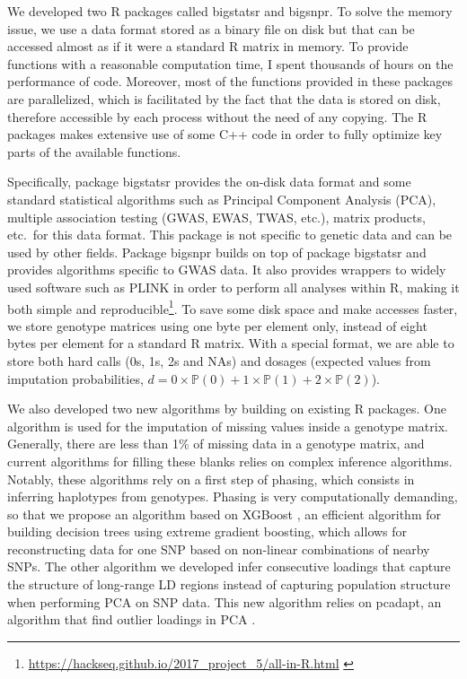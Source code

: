 We developed two R packages called bigstatsr and bigsnpr. 
To solve the memory issue, we use a data format stored as a binary file on disk but that can be accessed almost as if it were a standard R matrix in memory. 
To provide functions with a reasonable computation time, I spent thousands of hours on the performance of code. Moreover, most of the functions provided in these packages are parallelized, which is facilitated by the fact that the data is stored on disk, therefore accessible by each process without the need of any copying.
The R packages makes extensive use of some C++ code in order to fully optimize key parts of the available functions.

Specifically, package bigstatsr provides the on-disk data format and some standard statistical algorithms such as Principal Component Analysis (PCA), multiple association testing (GWAS, EWAS, TWAS, etc.), matrix products, etc.\ for this data format. 
This package is not specific to genetic data and can be used by other fields.
Package bigsnpr builds on top of package bigstatsr and provides algorithms specific to GWAS data. It also provides wrappers to widely used software such as PLINK in order to perform all analyses within R, making it both simple and reproducible\footnote{\url{https://hackseq.github.io/2017\_project\_5/all-in-R.html} \cite[]{grande2018hackathon}}.
To save some disk space and make accesses faster, we store genotype matrices using one  byte per element only, instead of eight bytes per element for a standard R matrix. With a special format, we are able to store both hard calls (0s, 1s, 2s and NAs) and dosages (expected values from imputation probabilities, $d = 0 \times \mathbb{P}(0) + 1 \times \mathbb{P}(1) + 2 \times \mathbb{P}(2)$).

We also developed two new algorithms by building on existing R packages.
One algorithm is used for the imputation of missing values inside a genotype matrix. Generally, there are less than 1\% of missing data in a genotype matrix, and current algorithms for filling these blanks relies on complex inference algorithms. 
Notably, these algorithms rely on a first step of phasing, which consists in inferring haplotypes from genotypes. Phasing is very computationally demanding, so that we propose an algorithm based on XGBoost \cite[]{chen2016xgboost}, an efficient algorithm for building decision trees using extreme gradient boosting, which allows for reconstructing data for one SNP based on non-linear combinations of nearby SNPs.
The other algorithm we developed infer consecutive loadings that capture the structure of long-range LD regions instead of capturing population structure when performing PCA on SNP data.
This new algorithm relies on pcadapt, an algorithm that find outlier loadings in PCA \cite[]{luu2017pcadapt}. 

